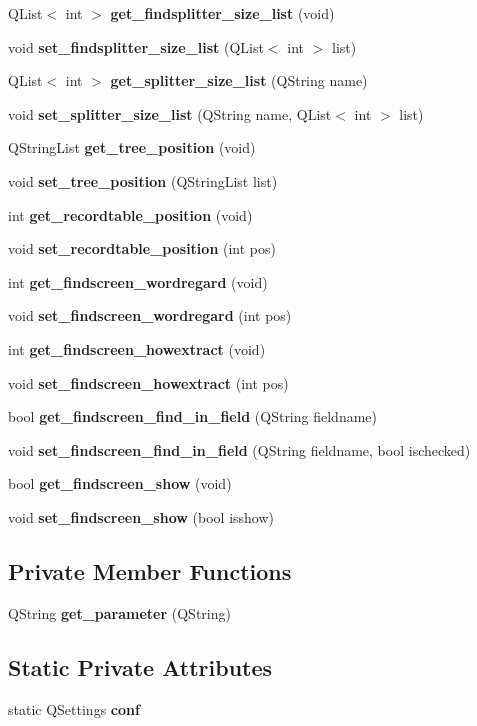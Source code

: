 \begin{CompactItemize}
\item 
QList$<$ int $>$ {\bf get\_\-findsplitter\_\-size\_\-list} (void)
\item 
void {\bf set\_\-findsplitter\_\-size\_\-list} (QList$<$ int $>$ list)
\item 
QList$<$ int $>$ {\bf get\_\-splitter\_\-size\_\-list} (QString name)
\item 
void {\bf set\_\-splitter\_\-size\_\-list} (QString name, QList$<$ int $>$ list)
\item 
QString\-List {\bf get\_\-tree\_\-position} (void)
\item 
void {\bf set\_\-tree\_\-position} (QString\-List list)
\item 
int {\bf get\_\-recordtable\_\-position} (void)
\item 
void {\bf set\_\-recordtable\_\-position} (int pos)
\item 
int {\bf get\_\-findscreen\_\-wordregard} (void)
\item 
void {\bf set\_\-findscreen\_\-wordregard} (int pos)
\item 
int {\bf get\_\-findscreen\_\-howextract} (void)
\item 
void {\bf set\_\-findscreen\_\-howextract} (int pos)
\item 
bool {\bf get\_\-findscreen\_\-find\_\-in\_\-field} (QString fieldname)
\item 
void {\bf set\_\-findscreen\_\-find\_\-in\_\-field} (QString fieldname, bool ischecked)
\item 
bool {\bf get\_\-findscreen\_\-show} (void)
\item 
void {\bf set\_\-findscreen\_\-show} (bool isshow)
\end{CompactItemize}
\subsection*{Private Member Functions}
\begin{CompactItemize}
\item 
QString {\bf get\_\-parameter} (QString)
\end{CompactItemize}
\subsection*{Static Private Attributes}
\begin{CompactItemize}
\item 
static QSettings {\bf conf}
\end{CompactItemize}



